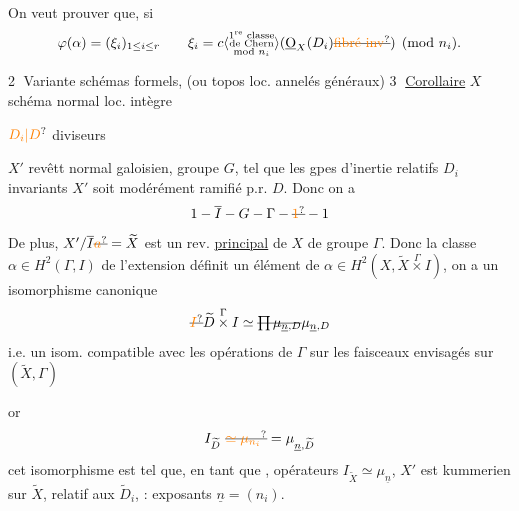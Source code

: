 On veut prouver que, si
\[
\varphi(\alpha)=(\xi_i)_{1\leq i\leq r}\qquad \xi_i=c\inserted{\substack{\text{1\textsuperscript{re} classe}\\\text{de Chern}\\\text{mod }n_i}}(\underline{\mathrm O}_X(D_i)\deleted{\unsure{\text{fibré inv}}})\pmod{n_i}.
\]

\textcircled{2} Variante schémas formels, (ou topos loc. annelés généraux)
\textcircled{3} \uline{Corollaire} $X$ schéma normal  loc. intègre

$\unsure{D_i|D}$ diviseurs   

$X'$ revêtt  normal galoisien, groupe $G$, tel que
les gpes d'inertie  relatifs  $D_i$ 
invariants  
$X'$ soit modérément ramifié p.r.   $D$. Donc on a 
\[
1\mathbin{-}\overline I\mathbin{-}G\mathbin{-}\Gamma\mathbin{-}\deleted{\unsure{1}}\mathbin{-}1
\]
 De plus,
$X'/\overline I\deleted{\unsure{a}}=\widetilde X$ est  un rev. \uline{principal} de $X$ de
groupe $\Gamma$. Donc la classe $\alpha\in H^2(\Gamma,I)$ de l'extension
définit un élément de $\alpha\in H^2(X,\widetilde X\overset{\Gamma}{\times} I)$,  on a un isomorphisme canonique
\[
\deleted{\unsure{I}}\widetilde D\overset{\Gamma}{\times}I\simeq\deleted{\prod\mu_{\underline n,D}}\mu_{\underline n,D}
\]
i.e. un isom. compatible avec les opérations de
$\Gamma$  sur les faisceaux envisagés sur $(\widetilde X,\Gamma)$

or
\[
I_{\widetilde D}\ \deleted{\unsure{\simeq\mu_{n_i}}}=\mu_{\underline n,\widetilde D}
\]
 cet isomorphisme est tel que, en tant
que , opérateurs $I_{\widetilde X}\simeq\mu_{\underline n}$, $X'$ est 
kummerien sur $\widetilde X$, relatif aux $\widetilde D_i$, : exposants $\underline n=(n_i)$.

